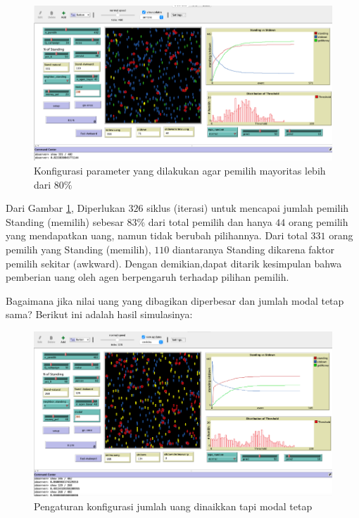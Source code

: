 \begin{figure}[H]
\centering
\includegraphics[width=\linewidth]{images/ch03/pemilusop9}
\caption{Konfigurasi parameter yang dilakukan agar pemilih mayoritas lebih dari $80\%$}
\label{fig:pemilusop9}
\end{figure}

Dari Gambar \ref{fig:pemilusop9}, Diperlukan $326$ siklus (iterasi) untuk mencapai jumlah pemilih Standing (memilih) sebesar $83\%$ dari total pemilih dan hanya $44$ orang pemilih yang mendapatkan uang, namun tidak berubah pilihannya. Dari total $331$ orang pemilih yang Standing (memilih), $110$ diantaranya Standing dikarena faktor pemilih sekitar (awkward). Dengan demikian,dapat ditarik kesimpulan bahwa pemberian uang oleh agen berpengaruh terhadap pilihan pemilih.

Bagaimana jika nilai uang yang dibagikan diperbesar dan jumlah modal tetap sama? Berikut ini adalah hasil simulasinya:

\begin{figure}[H]
\centering
\includegraphics[width=\linewidth]{images/ch03/pemilusop10}
\caption{Pengaturan konfigurasi jumlah uang dinaikkan tapi modal tetap}
\label{fig:pemilusop10}
\end{figure}

